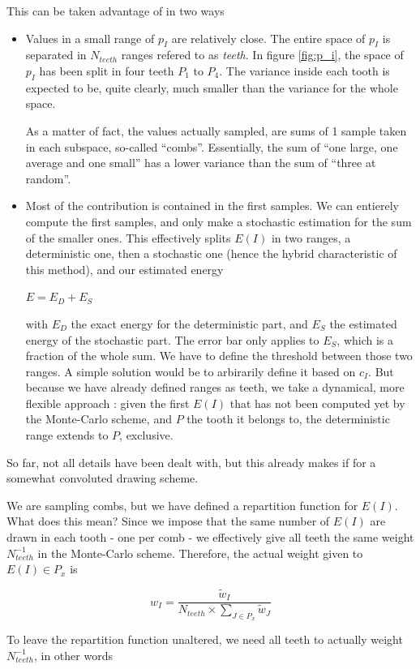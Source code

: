 This can be taken advantage of in two ways
\begin{itemize}
\item
Values in a small range of $p_I$ are relatively close. The entire space of $p_I$ is separated in $N_{teeth}$ ranges refered to as \emph{teeth}. In figure \ref{fig:p_i}, the space of $p_I$ has been split in four teeth $P_1$ to $P_4$. The variance inside each tooth is expected to be, quite clearly, much smaller than the variance for the whole space.

As a matter of fact, the values actually sampled, are sums of 1 sample taken in each subspace, so-called ``combs''.
Essentially, the sum of ``one large, one average and one small'' has a lower variance than the sum of ``three at random''.
\item
Most of the contribution is contained in the first samples. We can entierely compute the first samples, and only make a stochastic estimation for the sum of the smaller ones. This effectively splits $E(I)$ in two ranges, a deterministic one, then a stochastic one (hence the hybrid characteristic of this method), and our estimated energy

$E = E_D + E_S$

with $E_D$ the exact energy for the deterministic part, and $E_S$ the estimated energy of the stochastic part. The error bar only applies to $E_S$, which is a fraction of the whole sum.
We have to define the threshold between those two ranges. A simple solution would be to arbirarily define it based on $c_I$.
But because we have already defined ranges as teeth, we take a dynamical, more flexible approach : given the first $E(I)$ that has not been computed yet by the Monte-Carlo scheme, and $P$ the tooth it belongs to, the deterministic range extends to $P$, exclusive.
\end{itemize}

So far, not all details have been dealt with, but this already makes if for a somewhat convoluted drawing scheme.

We are sampling combs, but we have defined a repartition function for $E(I)$. What does this mean? Since we impose that the same number of $E(I)$ are drawn in each tooth - one per comb - we effectively give all teeth the same weight $N_{teeth}^{-1}$ in the Monte-Carlo scheme. Therefore, the actual weight given to $E(I) \in P_x$ is

$$w_I = \frac{\tilde w_I}{N_{teeth} \times \sum_{J \in P_x} \tilde w_J}$$

To leave the repartition function unaltered, we need all teeth to actually weight $N_{teeth}^{-1}$, in other words

